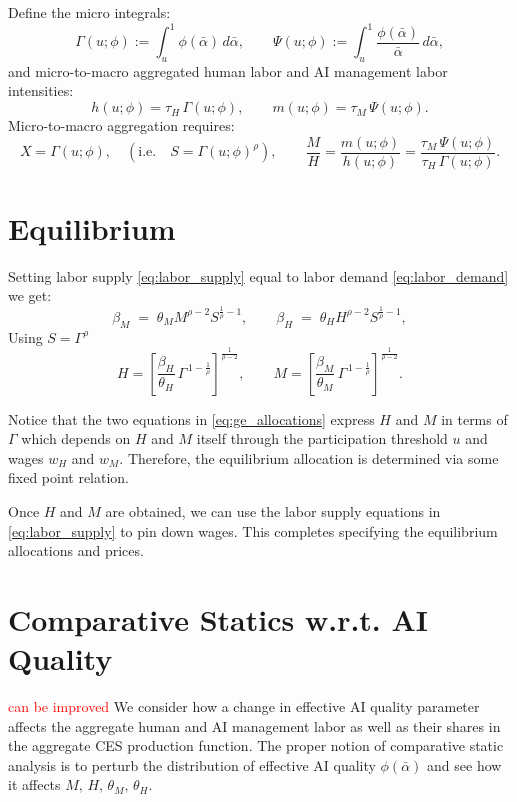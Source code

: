 \documentclass[english]{article}
\begin{document}
Define the micro integrals:
\begin{equation}
\Gamma(u;\phi):=\int_{u}^{1}\phi(\bar{\alpha})\,d\bar{\alpha},
\qquad
\Psi(u;\phi):=\int_{u}^{1}\frac{\phi(\bar{\alpha})}{\bar{\alpha}}\,d\bar{\alpha}, \label{eq:micro_integrals}
\end{equation}
and micro-to-macro aggregated human labor and AI management labor intensities:
\[
h(u;\phi)=\tau_H\,\Gamma(u;\phi),
\qquad 
m(u;\phi)=\tau_M\,\Psi(u;\phi).
\]
Micro-to-macro aggregation requires:
\begin{equation}
X=\Gamma(u;\phi),\quad (\text{i.e.}\quad S=\Gamma(u;\phi)^{\rho}),
\qquad 
\frac{M}{H}=\frac{m(u;\phi)}{h(u;\phi)}=\frac{\tau_M\,\Psi(u;\phi)}{\tau_H\,\Gamma(u;\phi)}.
\label{eq:AggMix}
\end{equation}

\section*{Equilibrium}
Setting labor supply \eqref{eq:labor_supply} equal to labor demand \eqref{eq:labor_demand} we get:
\begin{equation}
\beta_M \;=\; \theta_M M^{\rho-2} S^{\frac{1}{\rho}-1},
\qquad
\beta_H \;=\; \theta_H H^{\rho-2} S^{\frac{1}{\rho}-1}, \label{eq:labor_demand_supply}
\end{equation}
Using $S=\Gamma^\rho$
\begin{equation}
H
= \left[ \frac{\beta_H}{\theta_H}\,\Gamma^{\,1-\frac{1}{\rho}} \right]^{\frac{1}{\rho-2}},
\qquad
M
= \left[ \frac{\beta_M}{\theta_M}\,\Gamma^{\,1-\frac{1}{\rho}} \right]^{\frac{1}{\rho-2}}. \label{eq:ge_allocations}
\end{equation}

Notice that the two equations in \eqref{eq:ge_allocations} express $H$ and $M$ in terms of $\Gamma$ which depends on $H$ and $M$ itself through the participation threshold $u$ and wages $w_H$ and $w_M$.
Therefore, the equilibrium allocation is determined via some fixed point relation.

Once $H$ and $M$ are obtained, we can use the labor supply equations in \eqref{eq:labor_supply} to pin down wages.
This completes specifying the equilibrium allocations and prices.


\section*{Comparative Statics w.r.t. AI Quality}

\textcolor{red}{can be improved}
We consider how a change in effective AI quality parameter affects the aggregate human and AI management labor as well as their shares in the aggregate CES production function.
The proper notion of comparative static analysis is to perturb the distribution of effective AI quality $\phi(\bar{\alpha})$ and see how it affects $M,\,H,\,\theta_M,\,\theta_H$.
\end{document}
